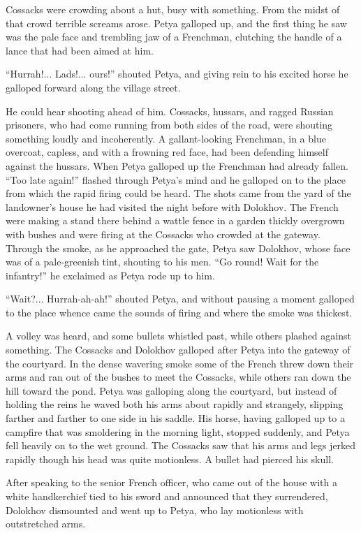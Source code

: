 Cossacks were crowding about a hut, busy with something. From the
midst of that crowd terrible screams arose. Petya galloped up,
and the first thing he saw was the pale face and trembling jaw of
a Frenchman, clutching the handle of a lance that had been aimed
at him.

``Hurrah!... Lads!... ours!'' shouted Petya, and giving rein to
his excited horse he galloped forward along the village street.

He could hear shooting ahead of him. Cossacks, hussars, and
ragged Russian prisoners, who had come running from both sides of
the road, were shouting something loudly and incoherently. A
gallant-looking Frenchman, in a blue overcoat, capless, and with
a frowning red face, had been defending himself against the
hussars. When Petya galloped up the Frenchman had already
fallen. ``Too late again!'' flashed through Petya's mind and he
galloped on to the place from which the rapid firing could be
heard. The shots came from the yard of the landowner's house he
had visited the night before with Dolokhov. The French were
making a stand there behind a wattle fence in a garden thickly
overgrown with bushes and were firing at the Cossacks who crowded
at the gateway.  Through the smoke, as he approached the gate,
Petya saw Dolokhov, whose face was of a pale-greenish tint,
shouting to his men. ``Go round! Wait for the infantry!'' he
exclaimed as Petya rode up to him.

``Wait?... Hurrah-ah-ah!'' shouted Petya, and without pausing a
moment galloped to the place whence came the sounds of firing and
where the smoke was thickest.

A volley was heard, and some bullets whistled past, while others
plashed against something. The Cossacks and Dolokhov galloped
after Petya into the gateway of the courtyard. In the dense
wavering smoke some of the French threw down their arms and ran
out of the bushes to meet the Cossacks, while others ran down the
hill toward the pond. Petya was galloping along the courtyard,
but instead of holding the reins he waved both his arms about
rapidly and strangely, slipping farther and farther to one side
in his saddle. His horse, having galloped up to a campfire that
was smoldering in the morning light, stopped suddenly, and Petya
fell heavily on to the wet ground. The Cossacks saw that his arms
and legs jerked rapidly though his head was quite motionless. A
bullet had pierced his skull.

After speaking to the senior French officer, who came out of the
house with a white handkerchief tied to his sword and announced
that they surrendered, Dolokhov dismounted and went up to Petya,
who lay motionless with outstretched arms.

